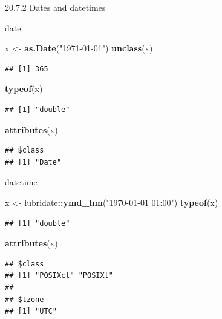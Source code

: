 \documentclass[ignorenonframetext,]{beamer}
\newenvironment{Shaded}{\begin{snugshade}}{\end{snugshade}}
\newcommand{\KeywordTok}[1]{\textcolor[rgb]{0.13,0.29,0.53}{\textbf{#1}}}
\newcommand{\StringTok}[1]{\textcolor[rgb]{0.31,0.60,0.02}{#1}}
\newcommand{\OperatorTok}[1]{\textcolor[rgb]{0.81,0.36,0.00}{\textbf{#1}}}
\newcommand{\NormalTok}[1]{#1}
\begin{document}
\begin{frame}[fragile]{20.7.2 Dates and datetimes}

\begin{block}{date}

\begin{Shaded}
\begin{Highlighting}[]
\NormalTok{x <-}\StringTok{ }\KeywordTok{as.Date}\NormalTok{(}\StringTok{"1971-01-01"}\NormalTok{)}
\KeywordTok{unclass}\NormalTok{(x)}
\end{Highlighting}
\end{Shaded}

\begin{verbatim}
## [1] 365
\end{verbatim}

\begin{Shaded}
\begin{Highlighting}[]
\KeywordTok{typeof}\NormalTok{(x)}
\end{Highlighting}
\end{Shaded}

\begin{verbatim}
## [1] "double"
\end{verbatim}

\begin{Shaded}
\begin{Highlighting}[]
\KeywordTok{attributes}\NormalTok{(x)}
\end{Highlighting}
\end{Shaded}

\begin{verbatim}
## $class
## [1] "Date"
\end{verbatim}

\end{block}

\end{frame}

\begin{frame}[fragile]{datetime}

\begin{Shaded}
\begin{Highlighting}[]
\NormalTok{x <-}\StringTok{ }\NormalTok{lubridate}\OperatorTok{::}\KeywordTok{ymd_hm}\NormalTok{(}\StringTok{"1970-01-01 01:00"}\NormalTok{)}
\KeywordTok{typeof}\NormalTok{(x)}
\end{Highlighting}
\end{Shaded}

\begin{verbatim}
## [1] "double"
\end{verbatim}

\begin{Shaded}
\begin{Highlighting}[]
\KeywordTok{attributes}\NormalTok{(x)}
\end{Highlighting}
\end{Shaded}

\begin{verbatim}
## $class
## [1] "POSIXct" "POSIXt" 
## 
## $tzone
## [1] "UTC"
\end{verbatim}

\end{frame}
\end{document}
